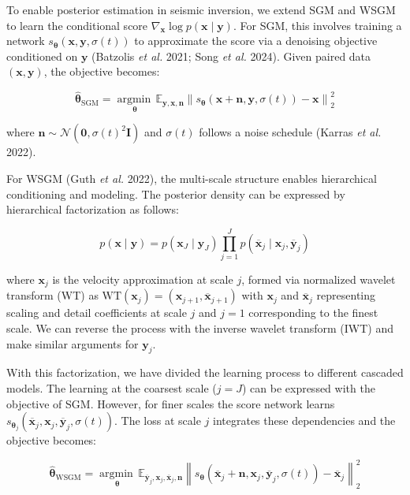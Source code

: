 \documentclass{IMAGE2025}
\begin{document}
To enable posterior estimation in seismic inversion, we extend SGM and
WSGM to learn the conditional score
\(\nabla_{\mathbf{x}} \log p(\mathbf{x} \mid \mathbf{y})\). For SGM,
this involves training a network
\(s_{\boldsymbol{\theta}}(\mathbf{x}, \mathbf{y}, \sigma(t))\) to
approximate the score via a denoising objective conditioned on
\(\mathbf{y}\) (Batzolis \emph{et al.} 2021; Song \emph{et al.} 2024).
Given paired data \((\mathbf{x}, \mathbf{y})\), the objective becomes:

\[
\widehat{\boldsymbol{\theta}}_{\text{SGM}} = \mathop{\mathrm{argmin}\,}\limits_{\boldsymbol{\theta}}\mathbb{E}_{\mathbf{y},\mathbf{x}, \mathbf{n}} \left\| s_{\boldsymbol{\theta}}(\mathbf{x} + \mathbf{n}, \mathbf{y}, \sigma(t)) - \mathbf{x} \right\|_2^2
\]

where
\(\mathbf{n} \sim \mathcal{N}(\mathbf{0}, \sigma(t)^2 \mathbf{I})\) and
\(\sigma(t)\) follows a noise schedule (Karras \emph{et al.} 2022).

For WSGM (Guth \emph{et al.} 2022), the multi-scale structure enables
hierarchical conditioning and modeling. The posterior density can be
expressed by hierarchical factorization as follows:

\[
p(\mathbf{x} \mid \mathbf{y}) = p(\mathbf{x}_J \mid \mathbf{y}_J) \prod_{j = 1}^{J} p(\overline{\mathbf{x}}_j \mid \mathbf{x}_j, \overline{\mathbf{y}}_j)
\]

where \(\mathbf{x}_j\) is the velocity approximation at scale \(j\),
formed via normalized wavelet transform (WT) as
\(\text{WT}(\mathbf{x}_{j}) = (\mathbf{x}_{j+1}, \overline{\mathbf{x}}_{j+1})\)
with \(\mathbf{x}_j\) and \(\overline{\mathbf{x}}_j\) representing
scaling and detail coefficients at scale \(j\) and \(j=1\) corresponding
to the finest scale. We can reverse the process with the inverse wavelet
transform (IWT) and make similar arguments for \(\mathbf{y}_j\).

With this factorization, we have divided the learning process to
different cascaded models. The learning at the coarsest scale (\(j=J\))
can be expressed with the objective of SGM. However, for finer scales
the score network learns
\(s_{\boldsymbol{\theta}_j}(\overline{\mathbf{x}}_j, \mathbf{x}_j, \overline{\mathbf{y}}_j,\sigma(t))\).
The loss at scale \(j\) integrates these dependencies and the objective
becomes:

\[
\widehat{\boldsymbol{\theta}}_{\text{WSGM}} = \mathop{\mathrm{argmin}\,}\limits_{\boldsymbol{\theta}}\mathbb{E}_{\overline{\mathbf{y}}_j,\mathbf{x}_j,\overline{\mathbf{x}}_j,\mathbf{n}} \left\| s_{\boldsymbol{\theta}}(\overline{\mathbf{x}}_j + \mathbf{n}, \mathbf{x}_j, \overline{\mathbf{y}}_j, \sigma(t)) - \overline{\mathbf{x}}_j \right\|_2^2
\]
\end{document}
